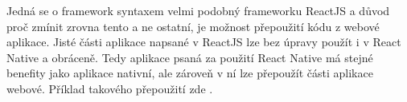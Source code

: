 Jedná se o framework syntaxem velmi podobný frameworku ReactJS a důvod proč zmínit zrovna tento a ne ostatní, je možnost přepoužití kódu z webové aplikace. Jisté části aplikace napsané v ReactJS lze bez úpravy použít i v React Native a obráceně. Tedy aplikace psaná za použití React Native má stejné benefity jako aplikace nativní, ale zároveň v ní lze přepoužít části aplikace webové. Příklad takového přepoužití zde \cite{sepulveda_2017_share}.

